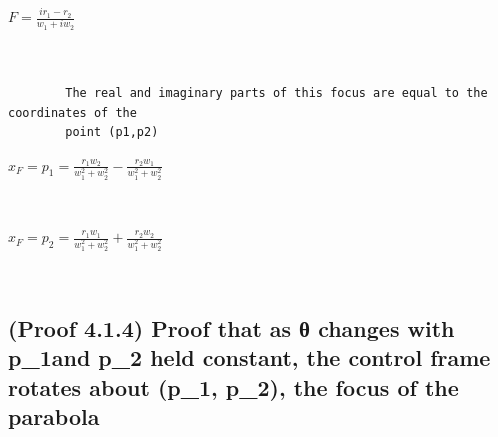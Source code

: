 \documentclass[11pt]{article}
\begin{document}
            $\displaystyle F = \frac{i r_{1} - r_{2}}{w_{1} + i w_{2}}$

            
            \begin{Verbatim}[commandchars=\\\{\}]


        The real and imaginary parts of this focus are equal to the coordinates of the
        point (p1,p2)
            \end{Verbatim}

            $\displaystyle x_{F} = p_{1} = \frac{r_{1} w_{2}}{w_{1}^{2} + w_{2}^{2}} - \frac{r_{2} w_{1}}{w_{1}^{2} + w_{2}^{2}}$

            
            \begin{Verbatim}[commandchars=\\\{\}]


            \end{Verbatim}

            $\displaystyle x_{F} = p_{2} = \frac{r_{1} w_{1}}{w_{1}^{2} + w_{2}^{2}} + \frac{r_{2} w_{2}}{w_{1}^{2} + w_{2}^{2}}$

            
            \begin{Verbatim}[commandchars=\\\{\}]


            \end{Verbatim}

    \subsection{(Proof 4.1.4) Proof that as θ changes with p\_1and p\_2 held constant, the control frame rotates about (p\_1, p\_2), the focus of the parabola}\label{proof-that-as-ux3b8-changes-with-p_1and-p_2-held-constant-the-control-frame-rotates-about-p_1-p_2-the-focus-of-the-parabola}
\end{document}
